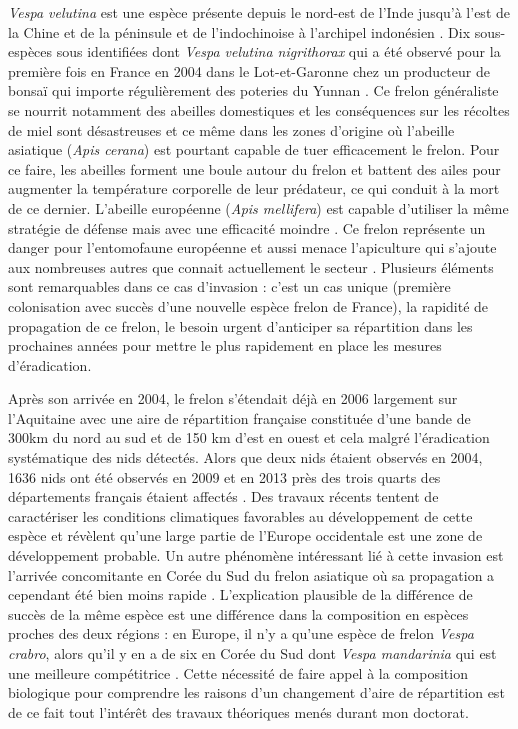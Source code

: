 \emph{Vespa velutina} est une espèce présente depuis le nord-est de
l'Inde jusqu'à l'est de la Chine et de la péninsule et de l'indochinoise
à l'archipel indonésien \citep{Villemant2006}. Dix sous-espèces sous
identifiées dont \emph{Vespa velutina nigrithorax} qui a été observé
pour la première fois en France en 2004 dans le Lot-et-Garonne chez un
producteur de bonsaï qui importe régulièrement des poteries du Yunnan
\citep{Villemant2006}. Ce frelon généraliste se nourrit notamment des
abeilles domestiques et les conséquences sur les récoltes de miel sont
désastreuses et ce même dans les zones d'origine où l'abeille asiatique
(\emph{Apis cerana}) est pourtant capable de tuer efficacement le
frelon. Pour ce faire, les abeilles forment une boule autour du frelon
et battent des ailes pour augmenter la température corporelle de leur
prédateur, ce qui conduit à la mort de ce dernier. L'abeille européenne
(\emph{Apis mellifera}) est capable d'utiliser la même stratégie de
défense mais avec une efficacité moindre \citep{Villemant2006}. Ce
frelon représente un danger pour l'entomofaune européenne et aussi
menace l'apiculture qui s'ajoute aux nombreuses autres que connait
actuellement le secteur \citep{Vanbergen2013}. Plusieurs éléments sont
remarquables dans ce cas d'invasion : c'est un cas unique (première
colonisation avec succès d'une nouvelle espèce frelon de France), la
rapidité de propagation de ce frelon, le besoin urgent d'anticiper sa
répartition dans les prochaines années pour mettre le plus rapidement en
place les mesures d'éradication.

Après son arrivée en 2004, le frelon s'étendait déjà en 2006 largement
sur l'Aquitaine avec une aire de répartition française constituée d'une
bande de 300km du nord au sud et de 150 km d'est en ouest
\citep{Villemant2006} et cela malgré l'éradication systématique des nids
détectés. Alors que deux nids étaient observés en 2004, 1636 nids ont
été observés en 2009 et en 2013 près des trois quarts des départements
français étaient affectés \citep{Robinet2016}. Des travaux récents
tentent de caractériser les conditions climatiques favorables au
développement de cette espèce \citep{Villemant2011} et révèlent qu'une
large partie de l'Europe occidentale est une zone de développement
probable. Un autre phénomène intéressant lié à cette invasion est
l'arrivée concomitante en Corée du Sud du frelon asiatique où sa
propagation a cependant été bien moins rapide \citep{Villemant2011}.
L'explication plausible de la différence de succès de la même espèce est
une différence dans la composition en espèces proches des deux régions :
en Europe, il n'y a qu'une espèce de frelon \emph{Vespa crabro}, alors
qu'il y en a de six en Corée du Sud dont \emph{Vespa mandarinia} qui est
une meilleure compétitrice \citep{Villemant2011}. Cette nécessité de
faire appel à la composition biologique pour comprendre les raisons d'un
changement d'aire de répartition est de ce fait tout l'intérêt des
travaux théoriques menés durant mon doctorat.

